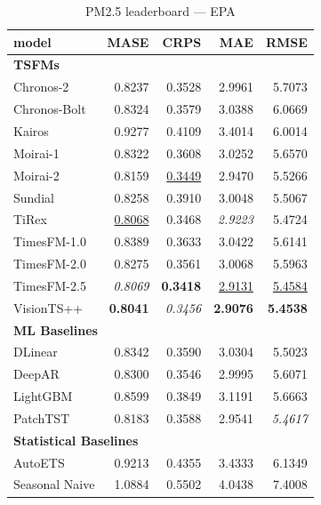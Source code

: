 \begin{table}[H]
\caption{PM2.5 leaderboard --- EPA}
\centering
\begin{small}
\begin{tabular}{lrrrr}
\toprule
model & MASE & CRPS & MAE & RMSE \\
\midrule
\multicolumn{5}{l}{\textbf{TSFMs}} \\
Chronos-2 & 0.8237 & 0.3528 & 2.9961 & 5.7073 \\
Chronos-Bolt & 0.8324 & 0.3579 & 3.0388 & 6.0669 \\
Kairos & 0.9277 & 0.4109 & 3.4014 & 6.0014 \\
Moirai-1 & 0.8322 & 0.3608 & 3.0252 & 5.6570 \\
Moirai-2 & 0.8159 & \underline{0.3449} & 2.9470 & 5.5266 \\
Sundial & 0.8258 & 0.3910 & 3.0048 & 5.5067 \\
TiRex & \underline{0.8068} & 0.3468 & \textit{2.9223} & 5.4724 \\
TimesFM-1.0 & 0.8389 & 0.3633 & 3.0422 & 5.6141 \\
TimesFM-2.0 & 0.8275 & 0.3561 & 3.0068 & 5.5963 \\
TimesFM-2.5 & \textit{0.8069} & \textbf{0.3418} & \underline{2.9131} & \underline{5.4584} \\
VisionTS++ & \textbf{0.8041} & \textit{0.3456} & \textbf{2.9076} & \textbf{5.4538} \\
\midrule
\multicolumn{5}{l}{\textbf{ML Baselines}} \\
DLinear & 0.8342 & 0.3590 & 3.0304 & 5.5023 \\
DeepAR & 0.8300 & 0.3546 & 2.9995 & 5.6071 \\
LightGBM & 0.8599 & 0.3849 & 3.1191 & 5.6663 \\
PatchTST & 0.8183 & 0.3588 & 2.9541 & \textit{5.4617} \\
\midrule
\multicolumn{5}{l}{\textbf{Statistical Baselines}} \\
AutoETS & 0.9213 & 0.4355 & 3.4333 & 6.1349 \\
Seasonal Naive & 1.0884 & 0.5502 & 4.0438 & 7.4008 \\
\bottomrule
\end{tabular}
\end{small}
\end{table}